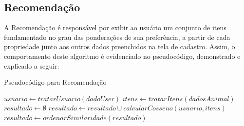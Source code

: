 \documentclass[portuguese]{textolivre}
\begin{document}
\subsection {Recomendação}

A Recomendação é responsável por exibir ao usuário um conjunto de itens fundamentado no grau das ponderações de sua preferência, a partir de cada propriedade junto aos outros dados preenchidos na tela de cadastro. Assim, o comportamento deste algoritmo é evidenciado no pseudocódigo, demonstrado e explicado a seguir:


\begin{algorithm}[hbt!]
\caption{Pseudocódigo para Recomendação}\label{alg:cap}
    \begin{algorithmic}[1]
        \State $usuario \gets tratarUsuario(dadoUser)$
        \State $itens \gets tratarItens(dadosAnimal)$
        \State $resultado \gets \emptyset$
            \State $resultado \gets resultado \cup calcularCosseno(usuario,itens)$
        \EndWhile
        \State $resultado \gets ordenarSimilaridade(resultado)$
    \end{algorithmic}
\end{algorithm}
\end{document}
